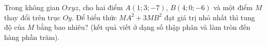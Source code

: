 \begin{ex}
Trong không gian $Oxyz$, cho hai điểm $A(1;3;-7)$, $B(4;0;-6)$ và một điểm $M$ thay đổi trên trục $Oy$. Để biểu thức $MA^2+3MB^2$ đạt giá trị nhỏ nhất thì tung độ của $M$ bằng bao nhiêu? (kết quả viết ở dạng số thập phân và làm tròn đến hàng phần trăm).
\end{ex}
